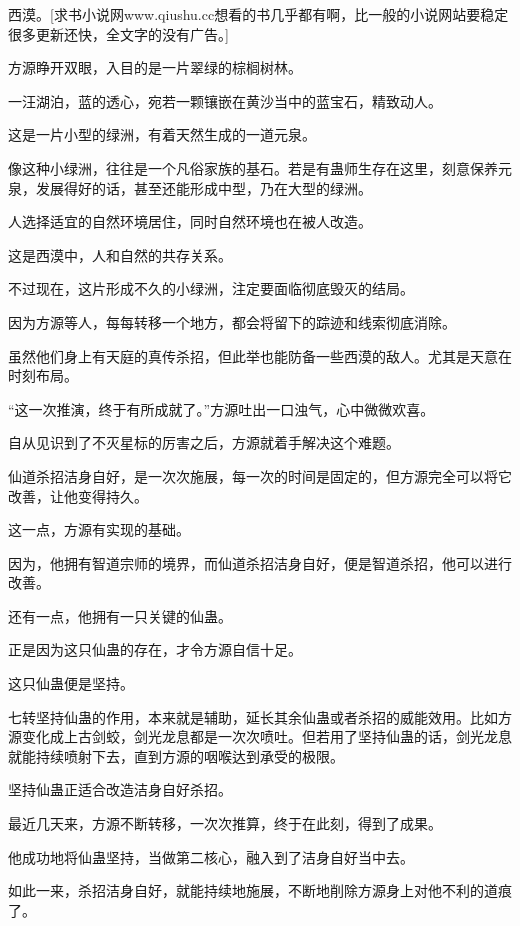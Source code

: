 
\begin{this_body}

西漠。[求书小说网www.qiushu.cc想看的书几乎都有啊，比一般的小说网站要稳定很多更新还快，全文字的没有广告。]

方源睁开双眼，入目的是一片翠绿的棕榈树林。

一汪湖泊，蓝的透心，宛若一颗镶嵌在黄沙当中的蓝宝石，精致动人。

这是一片小型的绿洲，有着天然生成的一道元泉。

像这种小绿洲，往往是一个凡俗家族的基石。若是有蛊师生存在这里，刻意保养元泉，发展得好的话，甚至还能形成中型，乃在大型的绿洲。

人选择适宜的自然环境居住，同时自然环境也在被人改造。

这是西漠中，人和自然的共存关系。

不过现在，这片形成不久的小绿洲，注定要面临彻底毁灭的结局。

因为方源等人，每每转移一个地方，都会将留下的踪迹和线索彻底消除。

虽然他们身上有天庭的真传杀招，但此举也能防备一些西漠的敌人。尤其是天意在时刻布局。

“这一次推演，终于有所成就了。”方源吐出一口浊气，心中微微欢喜。

自从见识到了不灭星标的厉害之后，方源就着手解决这个难题。

仙道杀招洁身自好，是一次次施展，每一次的时间是固定的，但方源完全可以将它改善，让他变得持久。

这一点，方源有实现的基础。

因为，他拥有智道宗师的境界，而仙道杀招洁身自好，便是智道杀招，他可以进行改善。

还有一点，他拥有一只关键的仙蛊。

正是因为这只仙蛊的存在，才令方源自信十足。

这只仙蛊便是坚持。

七转坚持仙蛊的作用，本来就是辅助，延长其余仙蛊或者杀招的威能效用。比如方源变化成上古剑蛟，剑光龙息都是一次次喷吐。但若用了坚持仙蛊的话，剑光龙息就能持续喷射下去，直到方源的咽喉达到承受的极限。

坚持仙蛊正适合改造洁身自好杀招。

最近几天来，方源不断转移，一次次推算，终于在此刻，得到了成果。

他成功地将仙蛊坚持，当做第二核心，融入到了洁身自好当中去。

如此一来，杀招洁身自好，就能持续地施展，不断地削除方源身上对他不利的道痕了。


\end{this_body}
